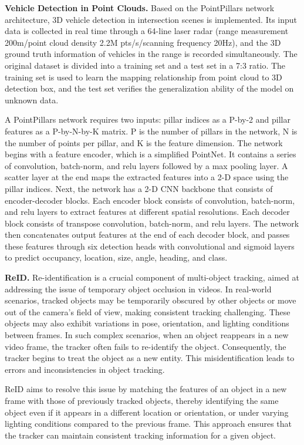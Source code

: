 \documentclass[lettersize,journal]{IEEEtran}
\begin{document}
\textbf{Vehicle Detection in Point Clouds.}
Based on the PointPillars network architecture, 3D vehicle detection in intersection scenes is implemented. Its input data is collected in real time through a 64-line laser radar (range measurement 200m/point cloud density 2.2M pts/s/scanning frequency 20Hz), and the 3D ground truth information of vehicles in the range is recorded simultaneously. The original dataset is divided into a training set and a test set in a 7:3 ratio. The training set is used to learn the mapping relationship from point cloud to 3D detection box, and the test set verifies the generalization ability of the model on unknown data.

A PointPillars network requires two inputs: pillar indices as a P-by-2 and pillar features as a P-by-N-by-K matrix. P is the number of pillars in the network, N is the number of points per pillar, and K is the feature dimension.
The network begins with a feature encoder, which is a simplified PointNet. It contains a series of convolution, batch-norm, and relu layers followed by a max pooling layer. A scatter layer at the end maps the extracted features into a 2-D space using the pillar indices.
Next, the network has a 2-D CNN backbone that consists of encoder-decoder blocks. Each encoder block consists of convolution, batch-norm, and relu layers to extract features at different spatial resolutions. Each decoder block consists of transpose convolution, batch-norm, and relu layers.
The network then concatenates output features at the end of each decoder block, and passes these features through six detection heads with convolutional and sigmoid layers to predict occupancy, location, size, angle, heading, and class.

\textbf{ReID.}
Re-identification is a crucial component of multi-object tracking, aimed at addressing the issue of temporary object occlusion in videos. 
In real-world scenarios, tracked objects may be temporarily obscured by other objects or move out of the camera's field of view, making consistent tracking challenging. 
These objects may also exhibit variations in pose, orientation, and lighting conditions between frames. 
In such complex scenarios, when an object reappears in a new video frame, the tracker often fails to re-identify the object. 
Consequently, the tracker begins to treat the object as a new entity. 
This misidentification leads to errors and inconsistencies in object tracking.

ReID aims to resolve this issue by matching the features of an object in a new frame with those of previously tracked objects, thereby identifying the same object even if it appears in a different location or orientation, or under varying lighting conditions compared to the previous frame. 
This approach ensures that the tracker can maintain consistent tracking information for a given object\cite{Alpher24d}.
\end{document}
